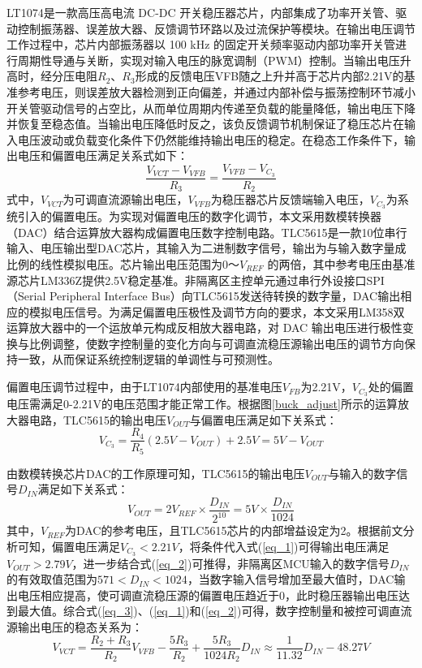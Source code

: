 LT1074是一款高压高电流 DC-DC 开关稳压器芯片，内部集成了功率开关管、驱动控制振荡器、误差放大器、反馈调节环路以及过流保护等模块。在输出电压调节工作过程中，芯片内部振荡器以 100 kHz 的固定开关频率驱动内部功率开关管进行周期性导通与关断，实现对输入电压的脉宽调制（PWM）控制。当输出电压升高时，经分压电阻$R_2$、$R_3$形成的反馈电压VFB随之上升并高于芯片内部2.21V的基准参考电压，则误差放大器检测到正向偏差，并通过内部补偿与振荡控制环节减小开关管驱动信号的占空比，从而单位周期内传递至负载的能量降低，输出电压下降并恢复至稳态值。当输出电压降低时反之，该负反馈调节机制保证了稳压芯片在输入电压波动或负载变化条件下仍然能维持输出电压的稳定。在稳态工作条件下，输出电压和偏置电压满足关系式如下：
\begin{equation}
	\frac{V_{VCT}-V_{VFB}}{R_3} = \frac{V_{VFB}-V_{C_3}}{R_2} \label{eq_3}
\end{equation}
式中，$V_{VCT}$为可调直流源输出电压，$V_{VFB}$为稳压器芯片反馈端输入电压，$V_{C_3}$为系统引入的偏置电压。为实现对偏置电压的数字化调节，本文采用数模转换器（DAC）结合运算放大器构成偏置电压数字控制电路。TLC5615是一款10位串行输入、电压输出型DAC芯片，其输入为二进制数字信号，输出为与输入数字量成比例的线性模拟电压。芯片输出电压范围为0～$V_{REF}$ 的两倍，其中参考电压由基准源芯片LM336Z提供2.5V稳定基准。非隔离区主控单元通过串行外设接口SPI（Serial Peripheral Interface Bus）向TLC5615发送待转换的数字量，DAC输出相应的模拟电压信号。为满足偏置电压极性及调节方向的要求，本文采用LM358双运算放大器中的一个运放单元构成反相放大器电路，对 DAC 输出电压进行极性变换与比例调整，使数字控制量的变化方向与可调直流稳压源输出电压的调节方向保持一致，从而保证系统控制逻辑的单调性与可预测性。

偏置电压调节过程中，由于LT1074内部使用的基准电压$V_{FB}$为2.21V，$V_{C_3}$处的偏置电压需满足0-2.21V的电压范围才能正常工作。根据图\ref{buck_adjust}所示的运算放大器电路，TLC5615的输出电压$V_{OUT}$与偏置电压满足如下关系式：
\begin{equation}
	V_{C_3} = \frac{R_4}{R_5}(2.5V-V_{OUT})+2.5V = 5V - V_{OUT}  \label{eq_1}
\end{equation}

由数模转换芯片DAC的工作原理可知，TLC5615的输出电压$V_{OUT}$与输入的数字信号$D_{IN}$满足如下关系式：
\begin{equation}
	V_{OUT} = 2V_{REF}\times\frac{D_{IN}}{2^{10}} = 5V \times \frac{D_{IN}}{1024}  \label{eq_2}
\end{equation}
其中，$V_{REF}$为DAC的参考电压，且TLC5615芯片的内部增益设定为2。根据前文分析可知，偏置电压满足$V_{C_3} < 2.21V$，将条件代入式(\ref{eq_1})可得输出电压满足$V_{OUT} > 2.79V$，进一步结合式(\ref{eq_2})可推得，非隔离区MCU输入的数字信号$D_{IN}$的有效取值范围为$571 < D_{IN} < 1024$，当数字输入信号增加至最大值时，DAC输出电压相应提高，使可调直流稳压源的偏置电压趋近于0，此时稳压器输出电压达到最大值。综合式(\ref{eq_3})、(\ref{eq_1})和(\ref{eq_2})可得，数字控制量和被控可调直流源输出电压的稳态关系为：
\begin{equation}
	V_{VCT} = \frac{R_2+R_3}{R_2}V_{VFB} - \frac{5R_3}{R_2} + \frac{5R_3}{1024R_2}D_{IN} \approx \frac{1}{11.32}D_{IN} - 48.27V
\end{equation}


